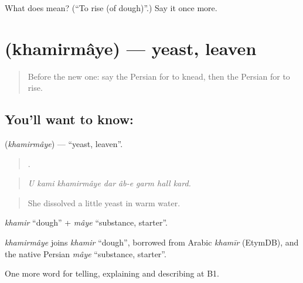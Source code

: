 \begin{tcolorbox}[breakable,colback=teal!4,colframe=teal!35!black,title={Before you move on}]
What does   mean? (\textquotedblleft{}To rise (of dough)\textquotedblright{}.) Say it once more.
\end{tcolorbox}
\section[\texorpdfstring{\fa{خمیرمایه} (khamirmâye)}{خمیرمایه (khamirmâye)}]{ (khamirmâye) — yeast, leaven}

\label{lesson:FA-C357-khamirmaye}



\begin{quote}
Before the new one: say the Persian for to knead, then the Persian for to rise.
\end{quote}

\subsection*{You'll want to know: }
\textbf{} (\emph{khamirmâye}) — \textquotedblleft{}yeast, leaven\textquotedblright{}.

\begin{quote}
       .
\end{quote}

\begin{quote}
\emph{U kami khamirmâye dar âb-e garm hall kard.}
\end{quote}

\begin{quote}
She dissolved a little yeast in warm water.
\end{quote}

\emph{khamir} \textquotedblleft{}dough\textquotedblright{} + \emph{mâye} \textquotedblleft{}substance, starter\textquotedblright{}.

\begin{cousinweb}
\emph{khamirmâye} joins \emph{khamir} \textquotedblleft{}dough\textquotedblright{}, borrowed from Arabic \emph{khamīr} (EtymDB), and the native Persian \emph{mâye} \textquotedblleft{}substance, starter\textquotedblright{}.
\end{cousinweb}

\begin{grammarlens}[title={What you've built}]
One more word for telling, explaining and describing at B1.
\end{grammarlens}

